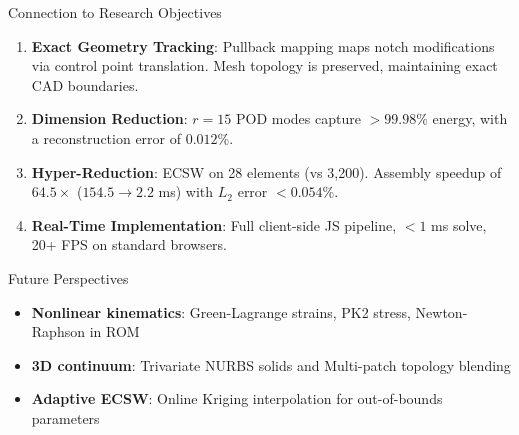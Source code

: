 \begin{frame}{Connection to Research Objectives}
  \small
  \begin{enumerate}
    \footnotesize
    \setlength{\itemsep}{2pt}
    \item \textbf{Exact Geometry Tracking}: Pullback mapping maps notch modifications via control point translation. Mesh topology is preserved, maintaining exact CAD boundaries.
    \item \textbf{Dimension Reduction}: $r=15$ POD modes capture $>99.98\%$ energy, with a reconstruction error of $0.012\%$.
    \item \textbf{Hyper-Reduction}: ECSW on 28 elements (vs 3,200). Assembly speedup of \textbf{$64.5\times$} ($154.5\to 2.2$ ms) with $L_2$ error $<0.054\%$.
    \item \textbf{Real-Time Implementation}: Full client-side JS pipeline, $< 1$ ms solve, 20+ FPS on standard browsers.
  \end{enumerate}
  \vspace{0.05cm}
  \begin{block}{Future Perspectives}
    \footnotesize
    \begin{itemize}
      \setlength{\itemsep}{1pt}
      \item \textbf{Nonlinear kinematics}: Green-Lagrange strains, PK2 stress, Newton-Raphson in ROM
      \item \textbf{3D continuum}: Trivariate NURBS solids and Multi-patch topology blending
      \item \textbf{Adaptive ECSW}: Online Kriging interpolation for out-of-bounds parameters
    \end{itemize}
  \end{block}
\end{frame}

